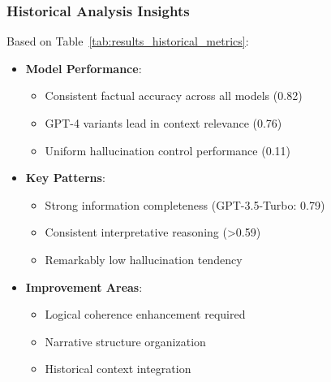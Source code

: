 \subsubsection{Historical Analysis Insights}
Based on Table~\ref{tab:results_historical_metrics}:
\begin{itemize}
    \item \textbf{Model Performance}:
    \begin{itemize}
        \item Consistent factual accuracy across all models (0.82)
        \item GPT-4 variants lead in context relevance (0.76)
        \item Uniform hallucination control performance (0.11)
    \end{itemize}
    \item \textbf{Key Patterns}:
    \begin{itemize}
        \item Strong information completeness (GPT-3.5-Turbo: 0.79)
        \item Consistent interpretative reasoning (>0.59)
        \item Remarkably low hallucination tendency
    \end{itemize}
    \item \textbf{Improvement Areas}:
    \begin{itemize}
        \item Logical coherence enhancement required
        \item Narrative structure organization
        \item Historical context integration
    \end{itemize}
\end{itemize}

